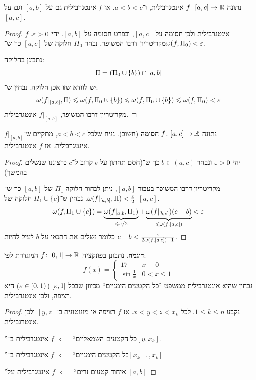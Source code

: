 \documentclass[name=רשימות חדו''א 2א]{../../../tex/classes/noChapterMegasumPreamble}
\begin{document}
	\begin{Theorem}[תת־קטע]
		נתונה $f \colon [a, c] \to \mathbb{R}$ אינטגרבילית, ו־$a < b < c$. אז $f$ אינטגרבילית גם על $[a, b]$ וגם על $[a, c]$.
	\end{Theorem}
	\begin{proof}
		$f$ אינטגרבילית ולכן חסומה על $[a, c]$, ובפרט חסומה על $[a, b]$. יהי $\eg > 0$. מקריטריון דרבו המשופר, נבחר $\Pi_0$ חלוקה של $[a, c]$ כך ש־$\wg(f, \Pi_0) < \eg$.

		נתבונן בחלוקה:
		\[ \Pi = \left ( \Pi_0 \cup \{b\} \right ) \cap [a, b] \]
		יש לוודא שזו אכן חלוקה. נבחין ש־:
		\[ \wg(f|_{[a, b]}, \Pi) \le \wg(f, \Pi_0 \uplus \{b\}) \le \wg(f, \Pi_0 \cup \{b\}) \le \wg(f, \Pi_0) < \eg \]
		מקריטריון דרבו המשופר, $f|_{[a, b]}$ אינטגרבילית.
	\end{proof}

	\begin{Theorem}
		נתונה $f \colon [a, c] \to \mathbb{R}$ \textbf{חסומה} (חשוב). נניח שלכל $a < b < c$, מתקיים ש־$f|_{[a, b]}$ אינטגרבילית. אז $f$ אינטגרבילית.
	\end{Theorem}
	\begin{proof}
		יהי $\eg > 0$ ונבחר $b \in (a, c)$ כך ש־(חסם תחתון על $b$ קרוב ל־$c$ כרצוננו שנשלים בהמשך)

		מקריטריון דרבו המשופר בעבור $[a, b]$, ניתן לבחור חלוקה $\Pi_1$ של $[a, b]$ כך ש־$\wg(f|_{[a, b]}, \Pi) < \frac{\eg}{2}$. נבחין ש־$\Pi_1 \cup \{c\}$ חלוקה של $[a, c]$.
		\[ \wg(f, \Pi_1 \cup \{c\}) = \underbrace{\wg(f|_{a, b}, \Pi_1)}_{\le \eg/2} + \underbrace{\wg(f|_{[b, c]})(c - b)}_{\le \wg(f, [a, c])} < \eg \]
		כלומר נשלים את התנאי על $b$ לעיל להיות $c - b < \frac{\eg}{2\wg(f, [a, c]) + 1}$.
	\end{proof}


	\textbf{דוגמה. }נתבונן בפונקציה $f \colon [0, 1] \to \mathbb{R}$ המוגדרת לפי:
	\[ f(x) = \begin{cases}
		17 & x = 0 \\
		\sin \frac{1}{x} & 0 < x \le 1
	\end{cases} \]
	נבחין שהיא אינטגרבילית ממשפט ''כל הקטעים הימניים`` מכיוון שבכל $[\eg, 1]$ ($\eg \in (0, 1)$) היא רציפה, ולכן אינטגרבילית.

	\begin{proof}
		נקבע $1 \le k \le n$. לכל $x < y < z < x_k$. אז $f$ רציפה או מונוטונית ב־$[y, z]$ ולכן אינטרגבילית.
		
		''כל הקטעים השמאליים`` $\impliedby$ $f$ אינטגרבילית ב־$[y, x_k]$.
		
		''כל הקטעים הימניים`` $\impliedby$ $f$ אינטגרבילית ב־$[x_{k - 1}, x_k]$
		
		''איחוד קטעים זרים`` $\impliedby$ $f$ אינטגרבילית על $[a, b]$
	\end{proof}
\end{document}
